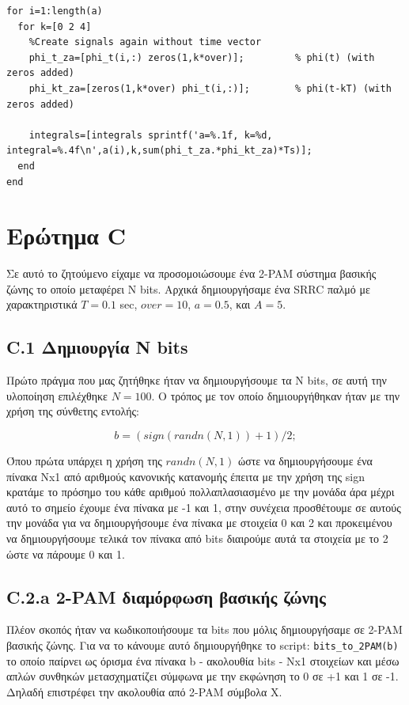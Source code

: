\documentclass[11pt]{article}
\begin{document}
\begin{lstlisting}[caption = {B.1.3}]
for i=1:length(a)
  for k=[0 2 4]
    %Create signals again without time vector
    phi_t_za=[phi_t(i,:) zeros(1,k*over)];         % phi(t) (with zeros added)
    phi_kt_za=[zeros(1,k*over) phi_t(i,:)];        % phi(t-kT) (with zeros added)
  
    integrals=[integrals sprintf('a=%.1f, k=%d, integral=%.4f\n',a(i),k,sum(phi_t_za.*phi_kt_za)*Ts)];
  end
end
\end{lstlisting}

    \section{Ερώτημα C}
    Σε αυτό το ζητούμενο είχαμε να προσομοιώσουμε ένα 2-PAM σύστημα βασικής ζώνης το οποίο μεταφέρει N bits. Αρχικά δημιουργήσαμε ένα SRRC παλμό με χαρακτηριστικά $T=0.1$ sec, $over=10$, $a=0.5$, και $A=5$.
    
    \subsection*{C.1 Δημιουργία N bits}
    Πρώτο πράγμα που μας ζητήθηκε ήταν να δημιουργήσουμε τα Ν bits, σε αυτή την υλοποίηση επιλέχθηκε $Ν = 100$. Ο τρόπος με τον οποίο δημιουργήθηκαν ήταν με την χρήση της σύνθετης εντολής: 
    
    $$b = (sign(randn(N, 1)) + 1)/2;$$
    
    \par \noindent
    Όπου πρώτα υπάρχει η χρήση της $randn(N,1)$ ώστε να δημιουργήσουμε ένα πίνακα Nx1 από αριθμούς κανονικής κατανομής έπειτα με την χρήση της sign κρατάμε το πρόσημο του κάθε αριθμού πολλαπλασιασμένο με την μονάδα άρα μέχρι αυτό το σημείο έχουμε ένα πίνακα με -1 και 1, στην συνέχεια προσθέτουμε σε αυτούς την μονάδα για να δημιουργήσουμε ένα πίνακα με στοιχεία 0 και 2 και προκειμένου να δημιουργήσουμε τελικά τον πίνακα από bits διαιρούμε αυτά τα στοιχεία με το 2 ώστε να πάρουμε 0 και 1.


    \subsection*{C.2.a 2-PAM διαμόρφωση βασικής ζώνης}
    Πλέον σκοπός ήταν να κωδικοποιήσουμε τα bits που μόλις δημιουργήσαμε σε 2-PAM βασικής ζώνης. Για να το κάνουμε αυτό δημιουργήθηκε το script: \texttt{bits\_to\_2PAM(b)} το οποίο παίρνει ως όρισμα ένα πίνακα b - ακολουθία bits - Νx1 στοιχείων και μέσω απλών συνθηκών μετασχηματίζει σύμφωνα με την εκφώνηση το 0 σε +1 και 1 σε -1. Δηλαδή επιστρέφει την ακολουθία από 2-PAM σύμβολα X.
    
\end{document}
